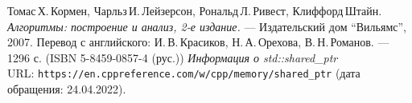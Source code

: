 \begin{thebibliography}{99}
Томас\,Х.\,Кормен, Чарльз\,И.\,Лейзерсон, Рональд\,Л.\,Ривест, Клиффорд\,Штайн.
{\itshape Алгоритмы: построение и анализ, 2-е издание.} --- Издательский дом \enquote{Вильямс}, 2007. Перевод с английского: И.\,В.\,Красиков, Н.\,А.\,Орехова, В.\,Н.\,Романов. --- 1296 с. (ISBN 5-8459-0857-4 (рус.))
{\itshape Информация о std::shared\_ptr} \\URL: \texttt{https://en.cppreference.com/w/cpp/memory/shared\_ptr} (дата обращения: 24.04.2022).
\end{thebibliography}
\pagebreak


